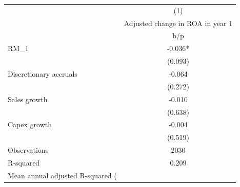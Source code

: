 {
\def\sym#1{\ifmmode^{#1}\else\(^{#1}\)\fi}
\begin{tabular}{l*{1}{c}}
\hline\hline
                    &\multicolumn{1}{c}{(1)}\\
                    &\multicolumn{1}{c}{Adjusted change in ROA in year 1}\\
                    &         b/p   \\
\hline
RM\_1                &      -0.036*  \\
                    &     (0.093)   \\
Discretionary accruals&      -0.064   \\
                    &     (0.272)   \\
Sales growth        &      -0.010   \\
                    &     (0.638)   \\
Capex growth        &      -0.004   \\
                    &     (0.519)   \\
\hline
Observations        &        2030   \\
R-squared           &       0.209   \\
Mean annual adjusted R-squared (%
\hline\hline
\end{tabular}
}
